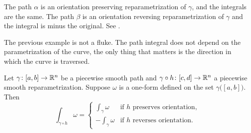 \begin{example}
\begin{equation*}
\end{equation*}
The path $\alpha$ is an orientation preserving reparametrization of
$\gamma$, and the integrals are the same.  The path $\beta$
is an orientation reversing reparametrization of $\gamma$ and the integral is
minus the original.  See .
\begin{myfigureht}
\caption{A circular path reparametrized in two different ways. The arrow
indicates the orientation of $\gamma$ and $\alpha$. The path $\beta$ traverses
the circle in the
opposite direction.\label{fig:circlepathrepar}}
\end{myfigureht}
\end{example}

The previous example is not a fluke.
The path integral does not depend on the parametrization of
the curve, the only thing that matters is the direction in which the curve
is traversed.

\begin{prop} \label{mv:prop:pathintrepararam}
Let $\gamma \colon [a,b] \to {\mathbb{R}}^n$ be a piecewise smooth path and
$\gamma \circ h \colon [c,d] \to {\mathbb{R}}^n$ a piecewise smooth reparametrization.
Suppose $\omega$ is a one-form defined on the set $\gamma\bigl([a,b]\bigr)$.  Then
\begin{equation*}
\int_{\gamma \circ h} \omega =
\begin{cases}
\int_{\gamma} \omega  & \text{if } h \text{ preserves orientation,}\\
-\int_{\gamma} \omega & \text{if } h \text{ reverses orientation.}
\end{cases}
\end{equation*}
\end{prop}


